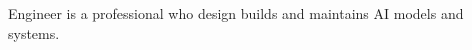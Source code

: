 \documentclass{cvClass} %
\begin{document}
    \begin{minipage}[t]{\textwidth}
      \hspace{-6mm}
      \centerline{ Engineer is a professional who design builds and maintains AI models and systems.}
      \vspace{5mm}
    \end{minipage}


\end{document}
